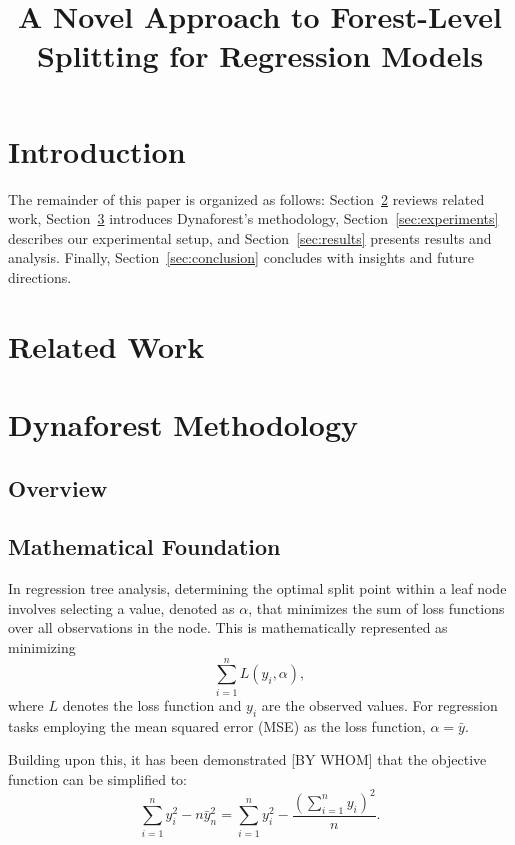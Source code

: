 \documentclass{article}
\title{A Novel Approach to Forest-Level Splitting for Regression Models}
\author{}
\date{}
\begin{document}
\maketitle

\begin{abstract}
\end{abstract}

\section{Introduction}
The remainder of this paper is organized as follows: Section~\ref{sec:relatedwork} reviews related work, Section~\ref{sec:methodology} introduces Dynaforest’s methodology, Section~\ref{sec:experiments} describes our experimental setup, and Section~\ref{sec:results} presents results and analysis. Finally, Section~\ref{sec:conclusion} concludes with insights and future directions.

\section{Related Work}\label{sec:relatedwork}

\section{Dynaforest Methodology}\label{sec:methodology}

\subsection{Overview}

\subsection{Mathematical Foundation}
In regression tree analysis, determining the optimal split point within a 
leaf node involves selecting a value, denoted as $\alpha$, that minimizes
the sum of loss functions over all observations in the node. This is 
mathematically represented as minimizing 
\[
\sum_{i=1}^n L(y_i, \alpha),
\]
where $L$ denotes the loss function and $y_i$ are the observed values. For 
regression tasks employing the mean squared error (MSE) as the loss function, $\alpha = \bar{y}$.

Building upon this, it has been demonstrated [BY WHOM] that the objective function can be 
simplified to:
\[
\sum_{i=1}^n y_i^2 - n\bar{y}_n^2 = \sum_{i=1}^n y_i^2 - \frac{(\sum_{i=1}^n y_i)^2}{n}.
\]
\end{document}
